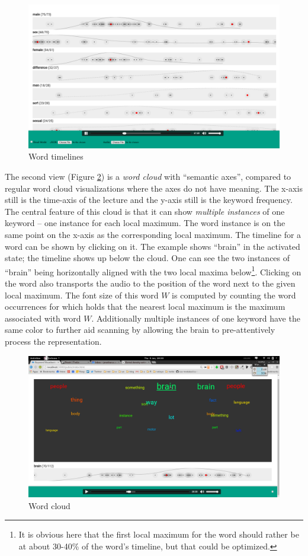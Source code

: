 \documentclass[]{article}
\begin{document}
\begin{figure}[htbp]
\centering
\includegraphics{images/timelines.png}
\caption{Word timelines \label{timelines}}
\end{figure}

The second view (Figure \ref{cloud}) is a \emph{word cloud} with
``semantic axes'', compared to regular word cloud visualizations where
the axes do not have meaning. The x-axis still is the time-axis of the
lecture and the y-axis still is the keyword frequency. The central
feature of this cloud is that it can show \emph{multiple instances} of
one keyword -- one instance for each local maximum. The word instance is
on the same point on the x-axis as the corresponding local maximum. The
timeline for a word can be shown by clicking on it. The example shows
``brain'' in the activated state; the timeline shows up below the cloud.
One can see the two instances of ``brain'' being horizontally aligned
with the two local maxima below\footnote{It is obvious here that the
  first local maximum for the word should rather be at about 30-40\% of
  the word's timeline, but that could be optimized.}. Clicking on the
word also transports the audio to the position of the word next to the
given local maximum. The font size of this word \(W\) is computed by
counting the word occurrences for which holds that the nearest local
maximum is the maximum associated with word \(W\). Additionally multiple
instances of one keyword have the same color to further aid scanning by
allowing the brain to pre-attentively process the representation.

\begin{figure}[htbp]
\centering
\includegraphics{images/cloud.png}
\caption{Word cloud \label{cloud}}
\end{figure}
\end{document}
